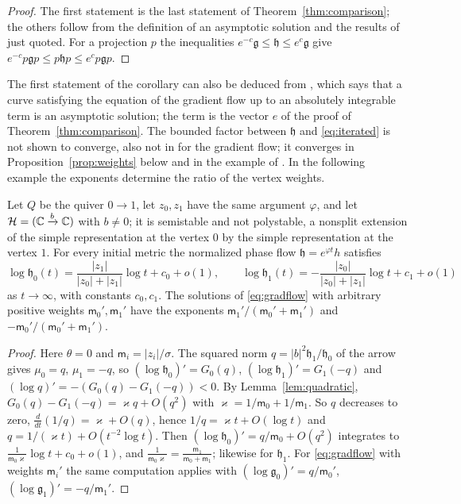 \begin{proof}
The first statement is the last statement of
Theorem~\ref{thm:comparison}; the others follow from the definition of an
asymptotic solution and the results of \cite{hkkp23} just quoted. For a
projection $p$ the inequalities
$e^{-c}\mathfrak g\leq\mathfrak h\leq e^{c}\mathfrak g$ give
$e^{-c}p\mathfrak gp\leq p\mathfrak hp\leq e^{c}p\mathfrak gp$.
\end{proof}

The first statement of the corollary can also be deduced from
\cite[Proposition~5.7]{hkkp23}, which says that a curve satisfying the
equation of the gradient flow up to an absolutely integrable term is an
asymptotic solution; the term is the vector $e$ of the proof of
Theorem~\ref{thm:comparison}. The bounded factor between $\mathfrak h$ and
\eqref{eq:iterated} is not shown to converge, also not in \cite{hkkp23} for
the gradient flow; it converges in Proposition~\ref{prop:weights} below and
in the example of \cite[Proposition~6.9]{wue26b}.
In the following example the exponents determine the ratio of the vertex
weights.

\begin{proposition}\label{prop:weights}
Let $Q$ be the quiver $0\to1$, let $z_0,z_1$ have the same argument
$\varphi$, and let $\mathcal H=(\mathbb C\xrightarrow{b}\mathbb C)$ with $b\neq0$; it is
semistable and not polystable, a nonsplit extension of the simple
representation at the vertex $0$ by the simple representation at the vertex
$1$. For every initial metric the normalized phase flow
$\mathfrak h=e^{\varphi t}h$ satisfies
\[
 \log\mathfrak h_0(t)=\frac{|z_1|}{|z_0|+|z_1|}\log t+c_0+o(1),\qquad
 \log\mathfrak h_1(t)=-\frac{|z_0|}{|z_0|+|z_1|}\log t+c_1+o(1)
\]
as $t\to\infty$, with constants $c_0,c_1$. The solutions of
\eqref{eq:gradflow} with arbitrary positive weights $\mathsf m_0',\mathsf m_1'$
have the exponents $\mathsf m_1'/(\mathsf m_0'+\mathsf m_1')$ and
$-\mathsf m_0'/(\mathsf m_0'+\mathsf m_1')$.
\end{proposition}

\begin{proof}
Here $\theta=0$ and $\mathsf m_i=|z_i|/\sigma$. The squared norm
$q=|b|^2\mathfrak h_1/\mathfrak h_0$ of the arrow gives $\mu_0=q$,
$\mu_1=-q$, so $(\log\mathfrak h_0)'=G_0(q)$, $(\log\mathfrak h_1)'=G_1(-q)$
and $(\log q)'=-(G_0(q)-G_1(-q))<0$. By Lemma~\ref{lem:quadratic},
$G_0(q)-G_1(-q)=\varkappa q+O(q^2)$ with
$\varkappa=1/\mathsf m_0+1/\mathsf m_1$. So $q$ decreases to zero,
$\frac d{dt}(1/q)=\varkappa+O(q)$, hence $1/q=\varkappa t+O(\log t)$ and
$q=1/(\varkappa t)+O(t^{-2}\log t)$. Then
$(\log\mathfrak h_0)'=q/\mathsf m_0+O(q^2)$ integrates to
$\frac1{\mathsf m_0\varkappa}\log t+c_0+o(1)$, and
$\frac1{\mathsf m_0\varkappa}=\frac{\mathsf m_1}{\mathsf m_0+\mathsf m_1}$;
likewise for $\mathfrak h_1$. For \eqref{eq:gradflow} with weights
$\mathsf m_i'$ the same computation applies with
$(\log\mathfrak g_0)'=q/\mathsf m_0'$, $(\log\mathfrak g_1)'=-q/\mathsf m_1'$.
\end{proof}

